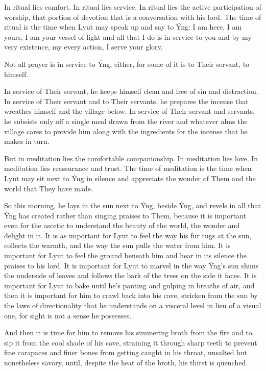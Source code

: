 In ritual lies comfort. In ritual lies service. In ritual lies the active participation of worship, that portion of devotion that is a conversation with his lord. The time of ritual is the time when Lyut may speak up and say to Ýng: I am here, I am yours, I am your vessel of light and all that I do is in service to you and by my very existence, my every action, I serve your glory.

Not all prayer is in service to Ýng, either, for some of it is to Their servant, to himself.

In service of Their servant, he keeps himself clean and free of sin and distraction. In service of Their servant and to Their servants, he prepares the incense that wreathes himself and the village below. In service of Their servant and servants, he subsists only off a single meal drawn from the river and whatever alms the village cares to provide him along with the ingredients for the incense that he makes in turn.

But in meditation lies the comfortable companionship. In meditation lies love. In meditation lies reassurance and trust. The time of meditation is the time when Lyut may sit next to Ýng in silence and appreciate the wonder of Them and the world that They have made.

So this morning, he lays in the sun next to Ýng, beside Ýng, and revels in all that Ýng has created rather than singing praises to Them, because it is important even for the ascetic to understand the beauty of the world, the wonder and delight in it. It is as important for Lyut to feel the way his fur tugs at the sun, collects the warmth, and the way the sun pulls the water from him. It is important for Lyut to feel the ground beneath him and hear in its silence the praises to his lord. It is important for Lyut to marvel in the way Ýng's sun shuns the underside of leaves and follows the bark of the trees on the side it faces. It is important for Lyut to bake until he's panting and gulping in breaths of air, and then it is important for him to crawl back into his cave, stricken from the sun by the laws of directionality that he understands on a visceral level in lieu of a visual one, for sight is not a sense he possesses.

And then it is time for him to remove his simmering broth from the fire and to sip it from the cool shade of his cave, straining it through sharp teeth to prevent fine carapaces and finer bones from getting caught in his throat, unsalted but nonetheless savory, until, despite the heat of the broth, his thirst is quenched.

